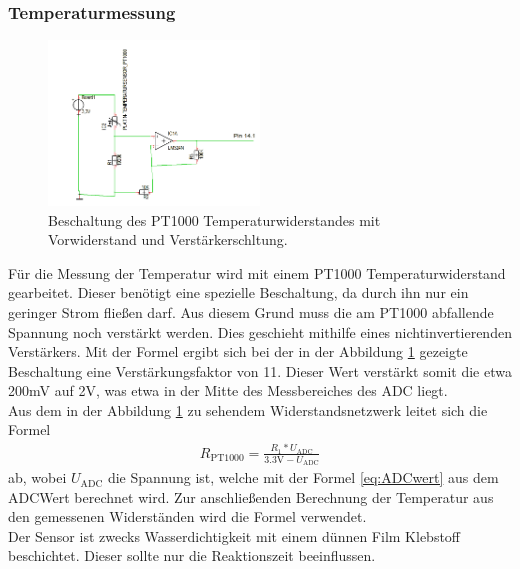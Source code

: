 \documentclass[12pt,a4paper,titlepage,headinclude,bibtotoc]{scrartcl}
\begin{document}
\subsubsection{Temperaturmessung}
\begin{figure}[!h]
\centering
\includegraphics[width=0.5\textwidth]{Fotos/PT1000Schaltung.png}
\caption{Beschaltung des PT1000 Temperaturwiderstandes mit Vorwiderstand und Verstärkerschltung.}
\label{fig:PT1000Schaltung}
\end{figure}
Für die Messung der Temperatur wird mit einem PT1000 Temperaturwiderstand gearbeitet.
Dieser benötigt eine spezielle Beschaltung, da durch ihn nur ein geringer Strom fließen darf.
Aus diesem Grund muss die am PT1000 abfallende Spannung noch verstärkt werden.
Dies geschieht mithilfe eines nichtinvertierenden Verstärkers. %
Mit der Formel %
ergibt sich bei der in der Abbildung \ref{fig:PT1000Schaltung} gezeigte Beschaltung eine Verstärkungsfaktor von 11.
Dieser Wert verstärkt somit die etwa 200\si{\milli\volt} auf 2\si{\volt}, was etwa in der Mitte des Messbereiches des ADC liegt.\\
Aus dem in der Abbildung \ref{fig:PT1000Schaltung} zu sehendem Widerstandsnetzwerk leitet sich die Formel
\begin{align}
	R_\text{PT1000}=\frac{R_1*U_\text{ADC}}{3.3\si{\volt}-U_\text{ADC}}
\end{align}
ab, wobei $U_\text{ADC}$ die Spannung ist, welche mit der Formel \eqref{eq:ADCwert} aus dem ADCWert berechnet wird.
Zur anschließenden Berechnung der Temperatur aus den gemessenen Widerständen wird die Formel %
verwendet.\\
Der Sensor ist zwecks Wasserdichtigkeit mit einem dünnen Film Klebstoff beschichtet.
Dieser sollte nur die Reaktionszeit beeinflussen.
\end{document}
